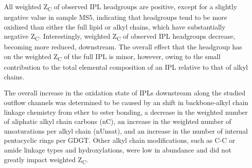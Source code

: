 All weighted Z\textsubscript{C} of observed IPL headgroups are positive, except for a slightly negative value in sample MS5, indicating that headgroups tend to be more oxidized than either the full lipid or alkyl chains, which have substantially negative Z\textsubscript{C}.
Interestingly, weighted Z\textsubscript{C} of observed IPL headgroups decrease, becoming more reduced, downstream. The overall effect that the headgroup has on the weighted Z\textsubscript{C} of the full IPL is minor, however, owing to the small contribution to the total elemental composition of an IPL relative to that of alkyl chains.

The overall increase in the oxidation state of IPLs downstream along the studied outflow channels was determined to be caused by an shift in backbone-alkyl chain linkage chemistry from ether to ester bonding, a decrease in the weighted number of aliphatic alkyl chain carbons (nC), an increase in the weighted number of unsaturations per alkyl chain (nUnsat), and an increase in the number of internal pentacyclic rings per GDGT. Other alkyl chain modifications, such as C-C or amide linkage types and hydroxylations, were low in abundance and did not greatly impact weighted Z\textsubscript{C}.




